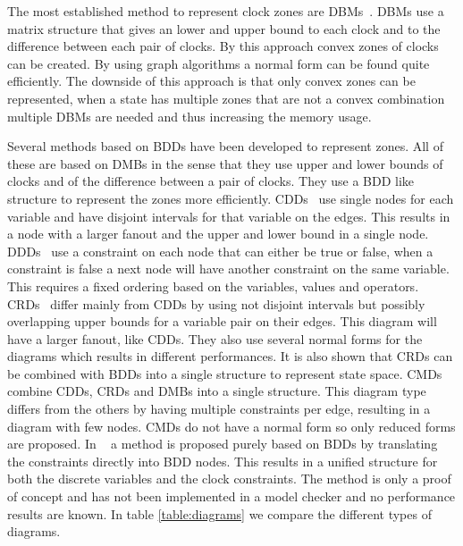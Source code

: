 \documentclass[11pt]{article}
\begin{document}
The most established method to represent clock zones are DBMs~\cite{dbmorig, bengtsson2002clocks}. DBMs use a matrix structure that gives an lower and upper bound to each clock and to the difference between each pair of clocks. By this approach convex zones of clocks can be created. By using graph algorithms a normal form can be found quite efficiently. The downside of this approach is that only convex zones can be represented, when a state has multiple zones that are not a convex combination multiple DBMs are needed and thus increasing the memory usage. 

Several methods based on BDDs have been developed to represent zones. All of these are based on DMBs in the sense that they use upper and lower bounds of clocks and of the difference between a pair of clocks. They use a BDD like structure to represent the zones more efficiently. CDDs~\cite{BRICS19491} use single nodes for each variable and have disjoint intervals for that variable on the edges. This results in a node with a larger fanout and the upper and lower bound in a single node. DDDs~\cite{ddds, ddd-datastructure-99} use a constraint on each node that can either be true or false, when a constraint is false a next node will have another constraint on the same variable. This requires a fixed ordering based on the variables, values and operators. CRDs~\cite{crds} differ mainly from CDDs by using not disjoint intervals but possibly overlapping upper bounds for a variable pair on their edges. This diagram will have a larger fanout, like CDDs. They also use several normal forms for the diagrams which results in different performances. It is also shown that CRDs can be combined with BDDs into a single structure to represent state space. CMDs~\cite{5702245} combine CDDs, CRDs and DMBs into a single structure. This diagram type differs from the others by having multiple constraints per edge, resulting in a diagram with few nodes. CMDs do not have a normal form so only reduced forms are proposed. In ~\cite{7098276, 7184781} a method is proposed purely based on BDDs by translating the constraints directly into BDD nodes. This results in a unified structure for both the discrete variables and the clock constraints. The method is only a proof of concept and has not been implemented in a model checker and no performance results are known. In table \ref{table:diagrams} we compare the different types of diagrams.
\end{document}
